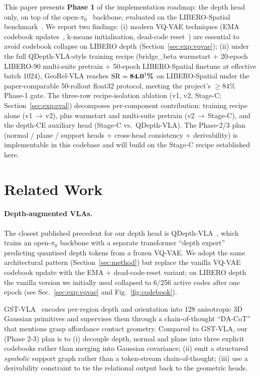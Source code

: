 \documentclass{article}
\newcommand{\PHResult}[1]{#1\textsuperscript{$\dagger$}}
\begin{document}
This paper presents \textbf{Phase 1} of the implementation roadmap: the depth head only, on top of the open-$\pi_0$~\citep{ren2024openpi0} backbone, evaluated on the LIBERO-Spatial benchmark~\citep{liu2023libero}.
We report two findings: (i) modern VQ-VAE techniques (EMA codebook updates~\citep{vandenoord2017vqvae}, k-means initialisation, dead-code reset~\citep{razavi2019vqvae2}) are essential to avoid codebook collapse on LIBERO depth (Section~\ref{sec:exp:vqvae}); (ii) under the full QDepth-VLA-style training recipe (bridge\_beta warmstart + 20-epoch LIBERO-90 multi-suite pretrain + 50-epoch LIBERO-Spatial finetune at effective batch 1024), GeoRel-VLA reaches $\mathrm{SR} = \textbf{\PHResult{84.0}\%}$ on LIBERO-Spatial under the paper-comparable 50-rollout float32 protocol, meeting the project's $\geq 84\%$ Phase-1 gate.
The three-row recipe-isolation ablation (v1, v2, Stage-C; Section~\ref{sec:exp:eval}) decomposes per-component contribution: training recipe alone (v1\,$\to$\,v2), plus warmstart and multi-suite pretrain (v2\,$\to$\,Stage-C), and the depth-CE auxiliary head (Stage-C vs.\ QDepth-VLA).
The Phase-2/3 plan (normal / plane / support heads + cross-head consistency + derivability) is implementable in this codebase and will build on the Stage-C recipe established here.

\section{Related Work}\label{sec:related}

\paragraph{Depth-augmented VLAs.} The closest published precedent for our depth head is QDepth-VLA~\citep{li2025qdepthvla}, which trains an open-$\pi_0$ backbone with a separate transformer ``depth expert'' predicting quantised depth tokens from a frozen VQ-VAE. We adopt the same architectural pattern (Section~\ref{sec:method}) but replace the vanilla VQ-VAE codebook update with the EMA + dead-code-reset variant; on LIBERO depth the vanilla version we initially used collapsed to 6/256 active codes after one epoch (see Sec.~\ref{sec:exp:vqvae} and Fig.~\ref{fig:codebook}).

GST-VLA~\citep{sarowar2026gstvla} encodes per-region depth and orientation into 128 anisotropic 3D Gaussian primitives and supervises them through a chain-of-thought ``DA-CoT'' that mentions grasp affordance contact geometry. Compared to GST-VLA, our (Phase 2-3) plan is to (i) decouple depth, normal and plane into three explicit codebooks rather than merging into Gaussian covariance; (ii) emit a structured \emph{symbolic} support graph rather than a token-stream chain-of-thought; (iii) use a derivability constraint to tie the relational output back to the geometric heads.
\end{document}

